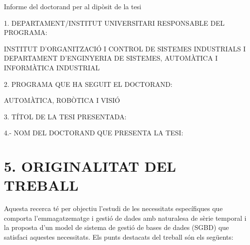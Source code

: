 \documentclass{article}
\begin{document}
Informe del doctorand per al dipòsit de la tesi


1. DEPARTAMENT/INSTITUT UNIVERSITARI RESPONSABLE DEL PROGRAMA:


INSTITUT D’ORGANITZACIÓ I CONTROL DE SISTEMES INDUSTRIALS I DEPARTAMENT D’ENGINYERIA DE SISTEMES, AUTOMÀTICA I INFORMÀTICA INDUSTRIAL


2. PROGRAMA QUE HA SEGUIT EL DOCTORAND:


AUTOMÀTICA, ROBÒTICA I VISIÓ


3.  TÍTOL DE LA TESI PRESENTADA:







4.- NOM DEL DOCTORAND QUE PRESENTA LA TESI:






\section*{5. ORIGINALITAT DEL TREBALL}


Aquesta recerca té per objectiu l'estudi de les necessitats
específiques que comporta l'emmagatzematge i gestió de dades amb
naturalesa de sèrie temporal i la proposta d'un model de sistema de
gestió de bases de dades (SGBD) que satisfaci aquestes
necessitats. Els punts destacats del treball són els següents:
\end{document}
